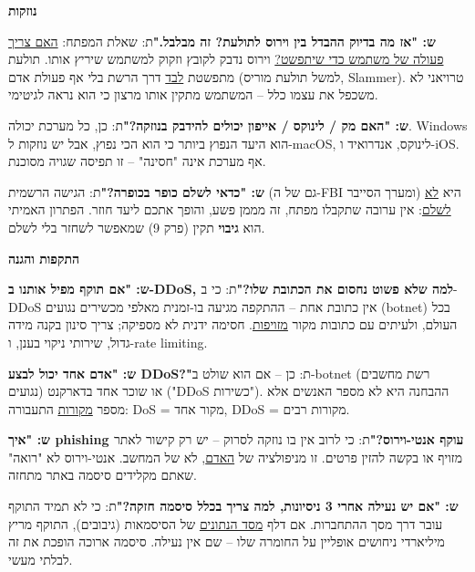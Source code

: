 \documentclass[11pt]{article}
\newcommand{\enLR}[1]{\textenglish{#1}}
\newcommand{\subheading}[1]{\vskip6pt{\bfseries\color{h3}#1\par}\vskip2pt}
\begin{document}
\subheading{נוזקות}

\textbf{ש: "אז מה בדיוק ההבדל בין וירוס לתולעת? זה מבלבל."}\newline ת: שאלת המפתח: \underline{האם צריך פעולה של משתמש כדי שיתפשט?} וירוס נדבק לקובץ וזקוק למשתמש שיריץ אותו. תולעת מתפשטת \underline{לבד} דרך הרשת בלי אף פעולת אדם (למשל תולעת מוריס, \enLR{Slammer).} טרויאני לא משכפל את עצמו כלל – המשתמש מתקין אותו מרצון כי הוא נראה לגיטימי.\par

\textbf{ש: "האם מק / לינוקס / אייפון יכולים להידבק בנוזקה?"}\newline ת: כן, כל מערכת יכולה. \enLR{Windows} הוא היעד הנפוץ ביותר כי הוא הכי נפוץ, אבל יש נוזקות ל-\enLR{macOS}, לינוקס, אנדרואיד ו-\enLR{iOS.} אף מערכת אינה "חסינה" – זו תפיסה שגויה מסוכנת.\par

\textbf{ש: "כדאי לשלם כופר בכופרה?"}\newline ת: הגישה הרשמית (גם של ה-\enLR{FBI} ומערך הסייבר) היא \underline{לא לשלם}: אין ערובה שתקבלו מפתח, זה מממן פשע, והופך אתכם ליעד חוזר. הפתרון האמיתי הוא \textbf{גיבוי} תקין (פרק \enLR{9)} שמאפשר לשחזר בלי לשלם.\par

\subheading{התקפות והגנה}

\textbf{ש: "אם תוקף מפיל אותנו ב-\enLR{DDoS}, למה שלא פשוט נחסום את הכתובת שלו?"}\newline ת: כי ב-\enLR{DDoS} אין כתובת אחת – ההתקפה מגיעה בו-זמנית מאלפי מכשירים נגועים \enLR{(botnet)} בכל העולם, ולעיתים עם כתובות מקור \underline{מזויפות}. חסימה ידנית לא מספיקה; צריך סינון בקנה מידה גדול, שירותי ניקוי בענן, ו-\enLR{rate limiting.}\par

\textbf{ש: "אדם אחד יכול לבצע \enLR{DDoS}?"}\newline ת: כן – אם הוא שולט ב-\enLR{botnet} (רשת מחשבים נגועים) או שוכר אחד בדארקנט ("\enLR{DDoS} כשירות"). ההבחנה היא לא מספר האנשים אלא מספר \underline{מקורות} התעבורה: \enLR{DoS} = מקור אחד, \enLR{DDoS} = מקורות רבים.\par

\textbf{ש: "איך \enLR{phishing} עוקף אנטי-וירוס?"}\newline ת: כי לרוב אין בו נוזקה לסרוק – יש רק קישור לאתר מזויף או בקשה להזין פרטים. זו מניפולציה של \underline{האדם}, לא של המחשב. אנטי-וירוס לא "רואה" שאתם מקלידים סיסמה באתר מתחזה.\par

\textbf{ש: "אם יש נעילה אחרי \enLR{3} ניסיונות, למה צריך בכלל סיסמה חזקה?"}\newline ת: כי לא תמיד התוקף עובר דרך מסך ההתחברות. אם דלף \underline{מסד הנתונים} של הסיסמאות (גיבובים), התוקף מריץ מיליארדי ניחושים אופליין על החומרה שלו – שם אין נעילה. סיסמה ארוכה הופכת את זה לבלתי מעשי.\par
\end{document}
